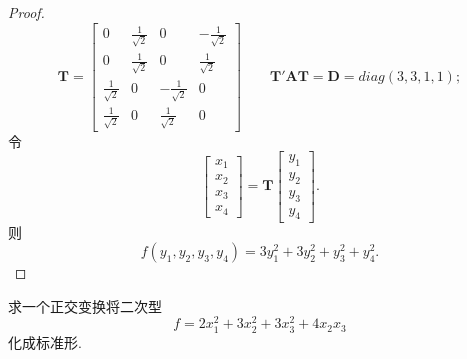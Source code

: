 \documentclass[lang=cn,11pt,normal]{elegantbook}
\begin{document}
\begin{proof}
		$$
		\boldsymbol{T}=
		\begin{bmatrix}
		0&\frac{1}{\sqrt{2}}&0&-\frac{1}{\sqrt{2}}\\
		0&\frac{1}{\sqrt{2}}&0&\frac{1}{\sqrt{2}}\\
		\frac{1}{\sqrt{2}}&0&-\frac{1}{\sqrt{2}}&0\\
		\frac{1}{\sqrt{2}}&0&\frac{1}{\sqrt{2}}&0
		\end{bmatrix}
		\qquad\boldsymbol{T}'\boldsymbol{AT}=\boldsymbol{D}=diag(3,3,1,1);
		$$
		令
		$$
		\begin{bmatrix}
		x_1\\x_2\\x_3\\x_4
		\end{bmatrix}
		=
		\boldsymbol{T}
		\begin{bmatrix}
		y_1\\y_2\\y_3\\y_4
		\end{bmatrix}.
		$$
		则
		$$f(y_1,y_2,y_3,y_4)=3y_1^2+3y_2^2+y_3^2+y_4^2.$$
	\end{proof}
	\begin{exercise}
		求一个正交变换将二次型
		$$
		f=2x_1^2+3x_2^2+3x_3^2+4x_2x_3
		$$
		化成标准形.
	\end{exercise}
\end{document}
